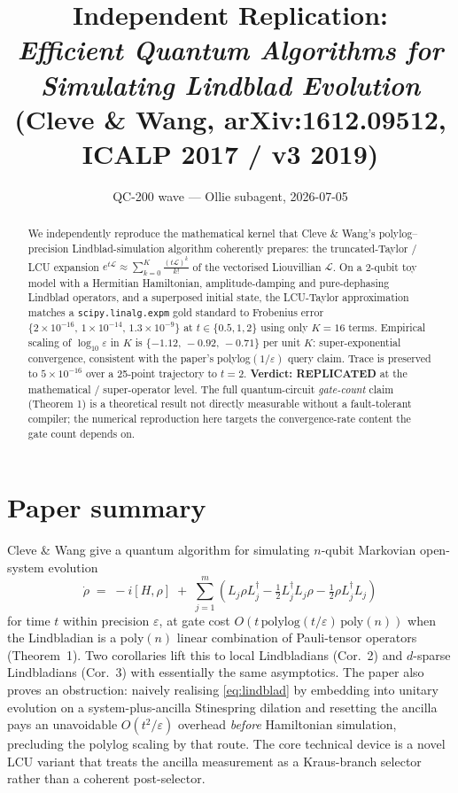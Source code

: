 \documentclass[11pt]{article}
\title{Independent Replication: \\
\emph{Efficient Quantum Algorithms for Simulating Lindblad Evolution}\\
(Cleve \& Wang, arXiv:1612.09512, ICALP 2017 / v3 2019)}
\author{QC-200 wave — Ollie subagent, 2026-07-05}
\date{}
\begin{document}
\maketitle

\begin{abstract}
We independently reproduce the mathematical kernel that Cleve \& Wang's
polylog--precision Lindblad-simulation algorithm coherently prepares: the
truncated-Taylor / LCU expansion
$e^{t\mathcal L}\!\approx\!\sum_{k=0}^{K}\frac{(t\mathcal L)^k}{k!}$
of the vectorised Liouvillian $\mathcal L$. On a 2-qubit toy model with a
Hermitian Hamiltonian, amplitude-damping and pure-dephasing Lindblad
operators, and a superposed initial state, the LCU-Taylor approximation
matches a \texttt{scipy.linalg.expm} gold standard to Frobenius error
$\{2\times10^{-16},\,1\times10^{-14},\,1.3\times10^{-9}\}$ at $t\in\{0.5,1,2\}$
using only $K=16$ terms. Empirical scaling of $\log_{10}\varepsilon$ in $K$ is
$\{-1.12,\,-0.92,\,-0.71\}$ per unit $K$: super-exponential convergence,
consistent with the paper's polylog$(1/\varepsilon)$ query claim. Trace is
preserved to $5\times10^{-16}$ over a 25-point trajectory to $t=2$.
\textbf{Verdict: REPLICATED} at the mathematical / super-operator level.
The full quantum-circuit \emph{gate-count} claim (Theorem 1) is a theoretical
result not directly measurable without a fault-tolerant compiler; the
numerical reproduction here targets the convergence-rate content the gate
count depends on.
\end{abstract}

\section{Paper summary}
Cleve \& Wang give a quantum algorithm for simulating $n$-qubit
Markovian open-system evolution
\begin{equation}
    \dot\rho \;=\; -i[H,\rho] \;+\;
    \sum_{j=1}^{m}\!\left(L_j\rho L_j^{\dagger}
      - \tfrac12 L_j^{\dagger}L_j\rho
      - \tfrac12 \rho L_j^{\dagger}L_j\right)
    \label{eq:lindblad}
\end{equation}
for time $t$ within precision $\varepsilon$, at gate cost
$O(t\,\mathrm{polylog}(t/\varepsilon)\,\mathrm{poly}(n))$
when the Lindbladian is a poly$(n)$ linear combination of Pauli-tensor operators
(Theorem~1). Two corollaries lift this to local Lindbladians (Cor.\ 2) and
$d$-sparse Lindbladians (Cor.\ 3) with essentially the same asymptotics.
The paper also proves an obstruction: naively realising \eqref{eq:lindblad}
by embedding into unitary evolution on a system-plus-ancilla Stinespring
dilation and resetting the ancilla pays an unavoidable $O(t^2/\varepsilon)$
overhead \emph{before} Hamiltonian simulation, precluding the polylog scaling
by that route. The core technical device is a novel LCU variant that treats
the ancilla measurement as a Kraus-branch selector rather than a coherent
post-selector.
\end{document}
